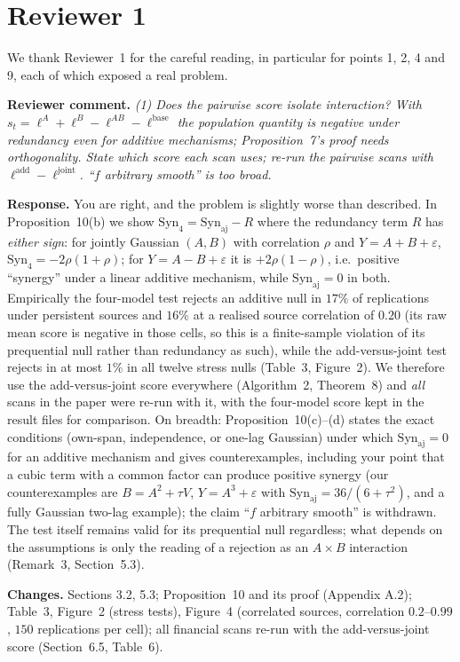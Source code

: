 \documentclass[11pt,a4paper]{article}
\newcommand{\rev}[1]{\par\noindent\textbf{Reviewer comment.} \emph{#1}}
\newcommand{\resp}{\par\noindent\textbf{Response.} }
\newcommand{\chg}{\par\noindent\textbf{Changes.} }
\begin{document}
\section*{Reviewer 1}

We thank Reviewer~1 for the careful reading, in particular for points 1, 2, 4 and 9, each of which exposed a real problem.

\rev{(1) Does the pairwise score isolate interaction? With $s_t=\ell^A+\ell^B-\ell^{AB}-\ell^{\mathrm{base}}$ the population quantity is negative under redundancy even for additive mechanisms; Proposition~7's proof needs orthogonality. State which score each scan uses; re-run the pairwise scans with $\ell^{\mathrm{add}}-\ell^{\mathrm{joint}}$. ``$f$ arbitrary smooth'' is too broad.}
\resp You are right, and the problem is slightly worse than described. In Proposition~10(b) we show $\mathrm{Syn}_4=\mathrm{Syn}_{\mathrm{aj}}-R$ where the redundancy term $R$ has \emph{either sign}: for jointly Gaussian $(A,B)$ with correlation $\rho$ and $Y=A+B+\varepsilon$, $\mathrm{Syn}_4=-2\rho(1+\rho)$; for $Y=A-B+\varepsilon$ it is $+2\rho(1-\rho)$, i.e.\ positive ``synergy'' under a linear additive mechanism, while $\mathrm{Syn}_{\mathrm{aj}}=0$ in both. Empirically the four-model test rejects an additive null in $17\%$ of replications under persistent sources and $16\%$ at a realised source correlation of $0.20$ (its raw mean score is negative in those cells, so this is a finite-sample violation of its prequential null rather than redundancy as such), while the add-versus-joint test rejects in at most $1\%$ in all twelve stress nulls (Table~3, Figure~2). We therefore use the add-versus-joint score everywhere (Algorithm~2, Theorem~8) and \emph{all} scans in the paper were re-run with it, with the four-model score kept in the result files for comparison. On breadth: Proposition~10(c)--(d) states the exact conditions (own-span, independence, or one-lag Gaussian) under which $\mathrm{Syn}_{\mathrm{aj}}=0$ for an additive mechanism and gives counterexamples, including your point that a cubic term with a common factor can produce positive synergy (our counterexamples are $B=A^2+\tau V$, $Y=A^3+\varepsilon$ with $\mathrm{Syn}_{\mathrm{aj}}=36/(6+\tau^2)$, and a fully Gaussian two-lag example); the claim ``$f$ arbitrary smooth'' is withdrawn. The test itself remains valid for its prequential null regardless; what depends on the assumptions is only the reading of a rejection as an $A\times B$ interaction (Remark~3, Section~5.3).
\chg Sections 3.2, 5.3; Proposition~10 and its proof (Appendix A.2); Table~3, Figure~2 (stress tests), Figure~4 (correlated sources, correlation $0.2$--$0.99$, $150$ replications per cell); all financial scans re-run with the add-versus-joint score (Section~6.5, Table~6).
\end{document}
